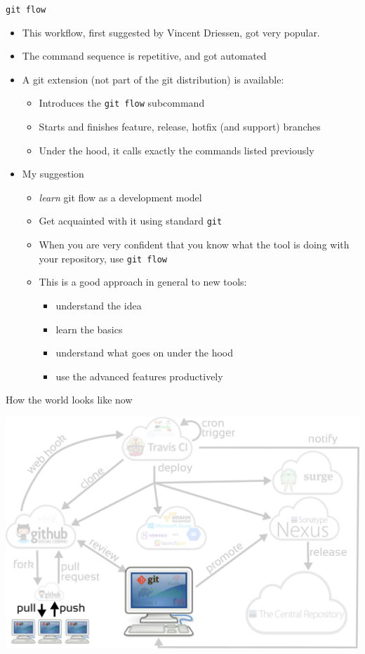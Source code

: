 \documentclass[presentation]{beamer}
\begin{document}
\begin{frame}[fragile]{\texttt{git flow}}
	\begin{itemize}
		\item This workflow, first suggested by Vincent Driessen, got very popular.
		\item The command sequence is repetitive, and got automated
		\item A git extension (not part of the git distribution) is available:
		\begin{itemize}
			\item Introduces the \texttt{git flow} subcommand
			\item Starts and finishes feature, release, hotfix (and support)  branches
			\item Under the hood, it calls exactly the commands listed previously
		\end{itemize}
		\item My suggestion 
		\begin{itemize}
			\item \textit{learn} git flow as a development model
			\item Get acquainted with it using standard \texttt{git}
			\item When you are very confident that you know what the tool is doing with your repository, use \texttt{git flow}
			\item This is a good approach in general to new tools:
			\begin{itemize}
				\item understand the idea
				\item learn the basics
				\item understand what goes on under the hood
				\item use the advanced features productively
			\end{itemize}
		\end{itemize}
	\end{itemize}
\end{frame}

\begin{frame}[fragile]{How the world looks like now}
	\begin{center}
		\includegraphics[width=.9\textwidth]{images/ci-gitflow}
	\end{center}
\end{frame}
\end{document}
